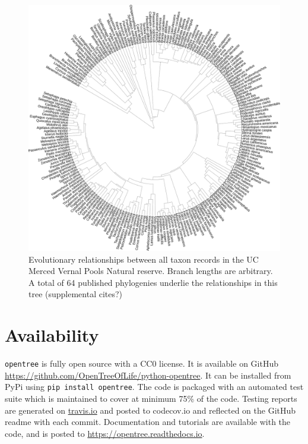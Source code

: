 \documentclass[oupdraft]{sysbio_sse}
\begin{document}
\begin{figure}[!p]
\centering\includegraphics[width=\textwidth]{vernal_animals}
\caption{Evolutionary relationships between all taxon records in the UC Merced Vernal Pools Natural reserve. Branch lengths are arbitrary. A total of 64 published phylogenies underlie the relationships in this tree (supplemental cites?)}
\label{vernalanimals}
\end{figure}



\section{Availability}
\label{sec5}

\texttt{opentree} is fully open source with a CC0 license. It is available on GitHub \url{ https://github.com/OpenTreeOfLife/python-opentree}. It can be installed from PyPi using \texttt{pip install opentree}. The code is packaged with an automated test suite which is maintained to cover at minimum 75\% of the code. Testing reports are generated on \url{travis.io} and posted to {codecov.io} and reflected on the GitHub readme with each commit. Documentation and tutorials are available with the code, and is posted to \url{https://opentree.readthedocs.io}.

\end{document}
